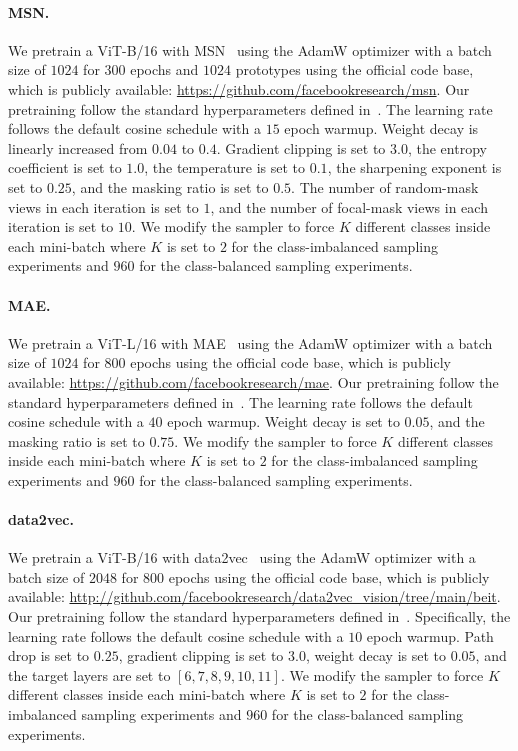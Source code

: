 \documentclass{article} %
\begin{document}
\paragraph{MSN.}
We pretrain a ViT-B/16 with MSN~\citep{assran2022masked} using the AdamW optimizer with a batch size of $1024$ for $300$ epochs and $1024$ prototypes using the official code base, which is publicly available: \url{https://github.com/facebookresearch/msn}.
Our pretraining follow the standard hyperparameters defined in~\citet{assran2022masked}.
The learning rate follows the default cosine schedule with a $15$ epoch warmup.
Weight decay is linearly increased from $0.04$ to $0.4$.
Gradient clipping is set to $3.0$, the entropy coefficient is set to $1.0$, the temperature is set to $0.1$, the sharpening exponent is set to $0.25$, and the masking ratio is set to $0.5$.
The number of random-mask views in each iteration is set to $1$, and the number of focal-mask views in each iteration is set to $10$.
We modify the sampler to force $K$ different classes inside each mini-batch where $K$ is set to $2$ for the  class-imbalanced sampling experiments and $960$ for the class-balanced sampling experiments.

\paragraph{MAE.}
We pretrain a ViT-L/16 with MAE~\citep{he2021masked} using the AdamW optimizer with a batch size of $1024$ for $800$ epochs using the official code base, which is publicly available: \url{https://github.com/facebookresearch/mae}.
Our pretraining follow the standard hyperparameters defined in~\citet{he2021masked}.
The learning rate follows the default cosine schedule with a $40$ epoch warmup.
Weight decay is set to $0.05$, and the masking ratio is set to $0.75$.
We modify the sampler to force $K$ different classes inside each mini-batch where $K$ is set to $2$ for the  class-imbalanced sampling experiments and $960$ for the class-balanced sampling experiments.

\paragraph{data2vec.} 
We pretrain a ViT-B/16 with data2vec~\citep{he2021masked} using the AdamW optimizer with a batch size of $2048$ for $800$ epochs using the official code base, which is publicly available: \url{http://github.com/facebookresearch/data2vec_vision/tree/main/beit}.
Our pretraining follow the standard hyperparameters defined in~\citet{baevski2022data2vec}.
Specifically, the learning rate follows the default cosine schedule with a $10$ epoch warmup.
Path drop is set to $0.25$, gradient clipping is set to $3.0$, weight decay is set to $0.05$, and the target layers are set to $[6,7,8,9,10,11]$.
We modify the sampler to force $K$ different classes inside each mini-batch where $K$ is set to $2$ for the  class-imbalanced sampling experiments and $960$ for the class-balanced sampling experiments.
\end{document}
